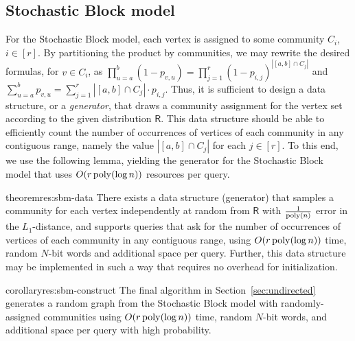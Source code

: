 \subsection{Stochastic Block model}
\label{sec:app_sbm}

For the Stochastic Block model, each vertex is assigned to some community $C_i$, $i \in [r]$. By partitioning the product by communities, we may rewrite the desired formulas, for $v \in C_i$, as $\prod_{u=a}^b (1-p_{v,u}) = \prod_{j=1}^r (1-p_{i,j})^{|[a,b]\cap C_j|}$ and $\sum_{u=a}^b p_{v,u}=\sum_{j=1}^r |[a,b]\cap C_j|\cdot p_{i,j}$. Thus, it is sufficient to design a data structure, or a \emph{generator}, that draws a community assignment for the vertex set according to the given distribution $\mathsf{R}$.
This data structure should be able to efficiently count the number of occurrences of vertices of each community in any contiguous range, namely the value $|[a,b]\cap C_j|$ for each $j \in [r]$.
To this end, we use the following lemma, yielding the generator for the Stochastic Block model that uses $O(r\, \mathrm{poly}(\log n))$ resources per query.

\begin{restatable}{theorem}{res:sbm-data}\label{thm:sbm-data}
There exists a data structure (generator) that samples a community for each vertex independently at random from $\mathsf{R}$ with $\frac{1}{\mathrm{poly}(n)}$ error in the $L_1$-distance, and supports queries that ask for the number of occurrences of vertices of each community in any contiguous range, using $O(r\,\mathrm{poly}(\log n))$ time, random $N$-bit words and additional space per query. Further, this data structure may be implemented in such a way that requires no overhead for initialization.
\end{restatable}
\begin{restatable}{corollary}{res:sbm-construct}\label{cor:sbm-construct}
The final algorithm in Section~\ref{sec:undirected} generates a random graph from the Stochastic Block model with randomly-assigned communities using $O(r\,\mathrm{poly}(\log n))$ time, random $N$-bit words, and additional space per query with high probability.
\end{restatable}

